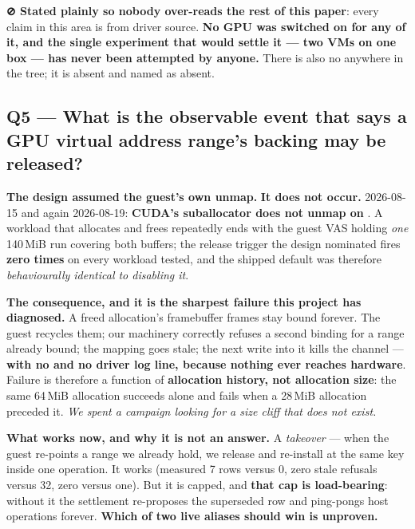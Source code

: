 \documentclass[10.5pt]{article}
\begin{document}
\textbf{⊘ Stated plainly so nobody over-reads the rest of this paper}: every claim in this area is
\inferred{} from driver source. \textbf{No GPU was switched on for any of it, and the single
experiment that would settle it — two VMs on one box — has never been attempted by anyone.} There
is also no  anywhere in the tree; it is absent and named as absent.

\subsection*{Q5 --- What is the observable event that says a GPU virtual address range's backing may be released?}

\textbf{The design assumed the guest's own unmap.} \textbf{It does not occur.} \measured{}
2026-08-15 and again 2026-08-19: \textbf{CUDA's suballocator does not unmap on }.
A workload that allocates and frees repeatedly ends with the guest VAS holding \emph{one} 140\,MiB
run covering both buffers; the release trigger the design nominated fires \textbf{zero times} on
every workload tested, and the shipped default was therefore \emph{behaviourally identical to
disabling it}.

\textbf{The consequence, and it is the sharpest failure this project has diagnosed.} A freed
allocation's framebuffer frames stay bound forever. The guest recycles them; our machinery
correctly refuses a second binding for a range already bound; the mapping goes stale; the next
write into it kills the channel — \textbf{with no  and no driver log line, because
nothing ever reaches hardware}. Failure is therefore a function of \textbf{allocation history, not
allocation size}: the same 64\,MiB allocation succeeds alone and fails when a 28\,MiB allocation
preceded it. \emph{We spent a campaign looking for a size cliff that does not exist.}

\textbf{What works now, and why it is not an answer.} A \emph{takeover} — when the guest re-points
a range we already hold, we release and re-install at the same key inside one operation. It works
(measured 7 rows versus 0, zero stale refusals versus 32, zero  versus one). But it is
capped, and \textbf{that cap is load-bearing}: without it the settlement re-proposes the
superseded row and ping-pongs host operations forever. \textbf{Which of two live aliases should
win is unproven.}
\end{document}
